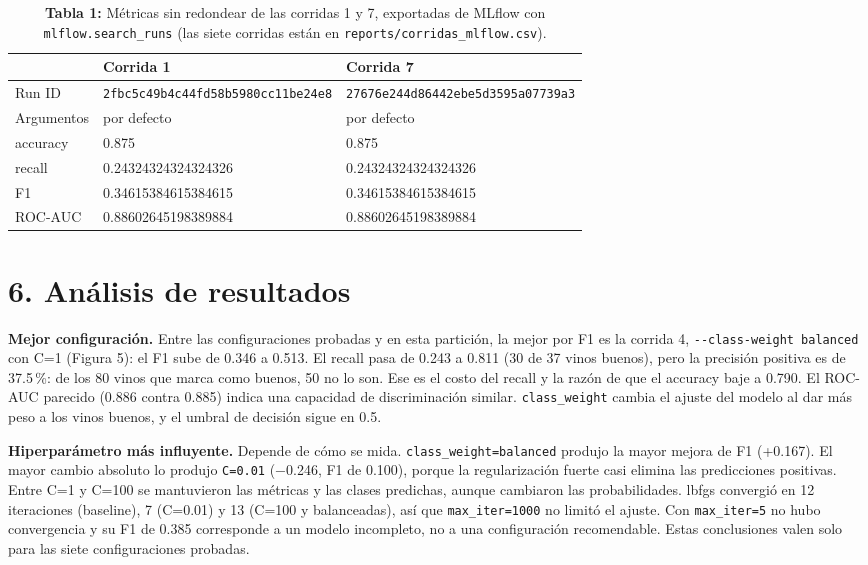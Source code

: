 \documentclass[11pt,letterpaper]{article}
\newcommand{\shell}[1]{\texttt{\small #1}}
\begin{document}
\begin{table}[H]
\centering\small
\caption*{\textbf{Tabla 1:} Métricas sin redondear de las corridas 1 y 7, exportadas
de MLflow con \shell{mlflow.search\_runs} (las siete corridas están en
\shell{reports/corridas\_mlflow.csv}).}
\begin{tabular}{@{}lll@{}}
\toprule
 & \textbf{Corrida 1} & \textbf{Corrida 7} \\
\midrule
Run ID & \shell{2fbc5c49b4c44fd58b5980cc11be24e8} & \shell{27676e244d86442ebe5d3595a07739a3} \\
Argumentos & por defecto & por defecto \\
accuracy & 0.875 & 0.875 \\
recall & 0.24324324324324326 & 0.24324324324324326 \\
F1 & 0.34615384615384615 & 0.34615384615384615 \\
ROC-AUC & 0.88602645198389884 & 0.88602645198389884 \\
\bottomrule
\end{tabular}
\end{table}

\section*{6. Análisis de resultados}

\textbf{Mejor configuración.} Entre las configuraciones probadas y en esta partición, la mejor
por F1 es la corrida 4, \shell{-{}-class-weight balanced} con C=1 (Figura 5): el F1 sube de 0.346
a 0.513.
El recall pasa de 0.243 a 0.811 (30 de 37 vinos buenos), pero la precisión positiva es de
37.5\,\%: de los 80 vinos que marca como buenos, 50 no lo son. Ese es el costo del recall y
la razón de que el accuracy baje a 0.790. El ROC-AUC parecido (0.886 contra 0.885) indica una
capacidad de discriminación similar. \shell{class\_weight} cambia el ajuste del modelo al dar
más peso a los vinos buenos, y el umbral de decisión sigue en 0.5.

\textbf{Hiperparámetro más influyente.} Depende de cómo se mida. \shell{class\_weight=balanced}
produjo la mayor mejora de F1 (+0.167). El mayor cambio absoluto lo produjo
\shell{C=0.01} (−0.246, F1 de 0.100), porque la regularización fuerte casi elimina las
predicciones positivas. Entre C=1 y C=100 se mantuvieron las métricas y las clases predichas,
aunque cambiaron las probabilidades. lbfgs convergió en 12 iteraciones (baseline), 7 (C=0.01)
y 13 (C=100 y balanceadas), así que \shell{max\_iter=1000} no limitó el ajuste. Con \shell{max\_iter=5} no hubo convergencia y su F1 de 0.385 corresponde a un modelo
incompleto, no a una configuración recomendable. Estas conclusiones valen solo para las siete
configuraciones probadas.
\end{document}
